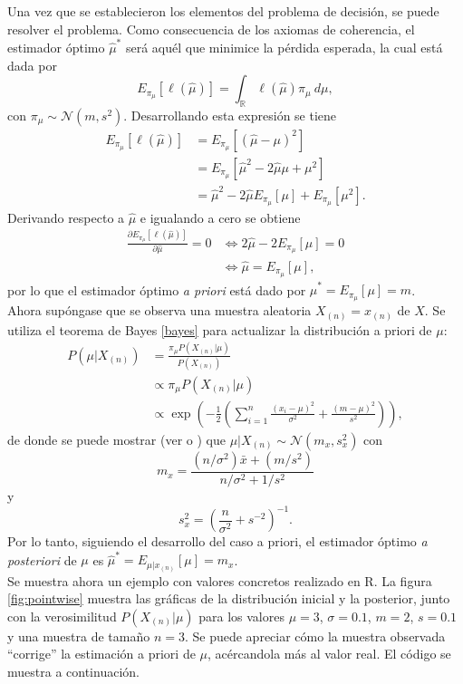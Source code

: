 \documentclass[11pt,a4paper]{article}
\begin{document}
Una vez que se establecieron los elementos del problema de decisión, se puede resolver el problema. Como consecuencia de los axiomas de coherencia, el estimador óptimo $\hat{\mu}^*$ será aquél que minimice la pérdida esperada, la cual está dada por $$E_{\pi_\mu}[\ell (\hat{\mu})] = \int_{\mathbb{R}} \ell(\hat{\mu})\pi_\mu \ d\mu,$$ con $\pi_\mu \sim \mathcal{N}(m, s^2)$. Desarrollando esta expresión se tiene
\begin{align*}
E_{\pi_\mu}[\ell (\hat{\mu})] &= E_{\pi_\mu}[(\hat{\mu} - \mu)^2]\\
&=  E_{\pi_\mu}[\hat{\mu}^2 - 2\hat{\mu}\mu + \mu^2]\\
&= \hat{\mu}^2 -2\hat{\mu}E_{\pi_\mu}[\mu] + E_{\pi_\mu}[\mu^2].
\end{align*}
Derivando respecto a $\hat{\mu}$ e igualando a cero se obtiene
\begin{align*}
\frac{\partial E_{\pi_\mu}[\ell (\hat{\mu})]}{\partial \hat{\mu}} = 0 &\iff 2\hat{\mu} - 2E_{\pi_\mu}[\mu] = 0\\
&\iff \hat{\mu} = E_{\pi_\mu}[\mu],
\end{align*}
por lo que el estimador óptimo \textit{a priori} está dado por $\hat{\mu}^* = E_{\pi_\mu}[\mu] = m$.\\

Ahora supóngase que se observa una muestra aleatoria $X_{(n)} = x_{(n)}$ de $X$. Se utiliza el teorema de Bayes \eqref{bayes} para actualizar la distribución a priori de $\mu$:
\begin{align*}
P(\mu | X_{(n)}) &= \frac{\pi_\mu P(X_{(n)}|\mu)}{P(X_{(n)})}\\
&\propto \pi_\mu P(X_{(n)}|\mu)\\
&\propto \exp\left( -\frac{1}{2} \left( \sum_{i=1}^n \frac{(x_i - \mu)^2}{\sigma^2} + \frac{(m - \mu)^2}{s^2}\right) \right),
\end{align*}
de donde se puede mostrar (ver  \citet{mendoza} o \citet{gelman}) que $\mu | X_{(n)} \sim \mathcal{N}(m_x, s_x^2)$ con $$m_x = \frac{(n / \sigma^2) \bar{x} + (m/s^2)}{n/\sigma^2 + 1/s^2}$$ y $$s_x^2 = \left( \frac{n}{\sigma^2} + s^{-2}\right)^{-1}.$$ Por lo tanto, siguiendo el desarrollo del caso a priori, el estimador óptimo \textit{a posteriori} de $\mu$ es $\hat{\mu}^* = E_{\mu | x_{(n)}}[\mu] = m_x$.\\

Se muestra ahora un ejemplo con valores concretos realizado en R. La figura \ref{fig:pointwise} muestra las gráficas de la distribución inicial y la posterior, junto con la verosimilitud $P(X_{(n)}|\mu)$ para los valores $\mu = 3$, $\sigma = 0.1$, $m = 2$, $s = 0.1$ y una muestra de tamaño $n = 3$. Se puede apreciar cómo la muestra observada ``corrige'' la estimación a priori de $\mu$, acércandola más al valor real. El código se muestra a continuación.\\
\end{document}
